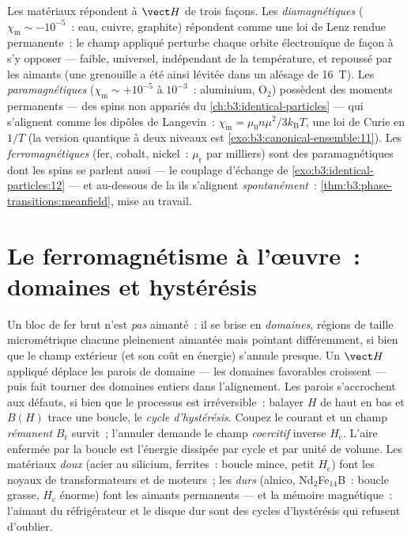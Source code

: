 \begin{remark}\label{rem:b3:electromagnetism-in-matter:zoo}
Les matériaux répondent à $\vect H$ de trois façons.
Les \emph{diamagnétiques} ($\chi_{\text{m}} \sim -10^{-5}$~: eau,
cuivre, graphite) répondent comme une loi de Lenz rendue permanente~:
le champ appliqué perturbe chaque orbite électronique de façon à s'y
opposer --- faible, universel, indépendant de la température, et
repoussé par les aimants (une grenouille a été ainsi lévitée dans un
alésage de \qty{16}{T}).
Les \emph{paramagnétiques} ($\chi_{\text{m}} \sim +10^{-5}$ à
$10^{-3}$~: aluminium, O$_2$) possèdent des moments permanents --- des
spins non appariés du \cref{ch:b3:identical-particles} --- qui
s'alignent comme les dipôles de Langevin~:
$\chi_{\text{m}} = \mu_0 n\mu^2/3k_{\text{B}}T$, une loi de Curie en
$1/T$ (la version quantique à deux niveaux est
\cref{exo:b3:canonical-ensemble:11}).
Les \emph{ferromagnétiques} (fer, cobalt, nickel~: $\mu_{\text{r}}$
par milliers) sont des paramagnétiques dont les spins se parlent aussi
--- le couplage d'échange de \cref{exo:b3:identical-particles:12} ---
et au-dessous de la  ils s'alignent
\emph{spontanément}~: \cref{thm:b3:phase-transitions:meanfield}, mise
au travail.
\end{remark}

\section{Le ferromagnétisme à l'œuvre~: domaines et hystérésis}

\begin{definition}\label{def:b3:electromagnetism-in-matter:hysteresis}
Un bloc de fer brut n'est \emph{pas} aimanté~: il se brise en
\emph{domaines}, régions de taille micrométrique chacune pleinement
aimantée mais pointant différemment, si bien que le champ extérieur
(et son coût en énergie) s'annule presque. Un $\vect H$ appliqué
déplace les parois de domaine --- les domaines favorables croissent
--- puis fait tourner des domaines entiers dans l'alignement. Les
parois s'accrochent aux défauts, si bien que le processus est
irréversible~: balayer $H$ de haut en bas et $B(H)$ trace une boucle,
le \emph{cycle d'hystérésis}. Coupez le courant et un champ
\emph{rémanent} $B_{\text{r}}$ survit~; l'annuler demande le champ
\emph{coercitif} inverse $H_{\text{c}}$. L'aire enfermée par la boucle
est l'énergie dissipée par cycle et par unité de volume. Les
matériaux \emph{doux} (acier au silicium, ferrites~: boucle mince,
petit $H_{\text{c}}$) font les noyaux de transformateurs et de
moteurs~; les \emph{durs} (alnico, Nd$_2$Fe$_{14}$B~: boucle grasse,
$H_{\text{c}}$ énorme) font les aimants permanents --- et la mémoire
magnétique~: l'aimant du réfrigérateur et le disque dur sont des
cycles d'hystérésis qui refusent d'oublier.
\end{definition}

